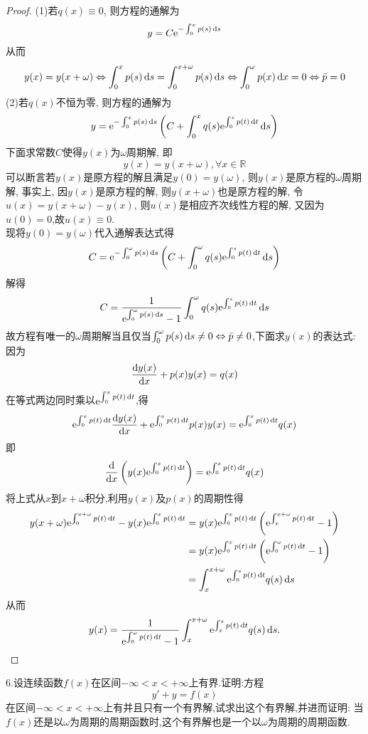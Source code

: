 \begin{proof}(1)若$q(x)\equiv0$, 则方程的通解为
\[y=C\mathrm{e}^{-\int_0^xp(s)\mathop{}\!\mathrm{d} s}\]
从而\[y(x)=y(x+\omega)\Leftrightarrow\int_0^xp(s)\mathop{}\!\mathrm{d} s=\int_0^{x+\omega}p(s)\mathop{}\!\mathrm{d} s\Leftrightarrow\int_0^{\omega}p(x)\mathop{}\!\mathrm{d} x=0\Leftrightarrow\bar{p}=0\]
(2)若$q(x)$不恒为零, 则方程的通解为
\[y=\mathrm{e}^{-\int_0^xp(s)\mathop{}\!\mathrm{d} s}\left(C+\int_0^xq(s)\mathrm{e}^{\int_0^sp(t)\mathop{}\!\mathrm{d} t}\mathop{}\!\mathrm{d} s\right)\]
下面求常数$C$使得$y(x)$为$\omega$周期解, 即
\[y(x)=y(x+\omega),\forall x\in\mathbb{R}\]
可以断言若$y(x)$是原方程的解且满足$y(0)=y(\omega)$, 则$y(x)$是原方程的$\omega$周期解, 事实上, 因$y(x)$是原方程的解, 则$y(x+\omega)$也是原方程的解, 令$u(x)=y(x+\omega)-y(x)$, 则$u(x)$是相应齐次线性方程的解, 又因为$u(0)=0$,故$u(x)\equiv0$.\\
现将$y(0)=y(\omega)$代入通解表达式得
\[C=\mathrm{e}^{-\int_0^{\omega}p(s)\mathop{}\!\mathrm{d} s}\left(C+\int_0^{\omega}q(s)\mathrm{e}^{\int_0^sp(t)\mathop{}\!\mathrm{d} t}\mathop{}\!\mathrm{d} s\right)\]
解得\[C=\frac{1}{\mathrm{e}^{\int_0^{\omega}p(s)\mathop{}\!\mathrm{d} s}-1}\int_0^{\omega}q(s)\mathrm{e}^{\int_0^sp(t)\mathop{}\!\mathrm{d} t}\mathop{}\!\mathrm{d} s\]
故方程有唯一的$\omega$周期解当且仅当$\int_0^{\omega}p(s)\mathop{}\!\mathrm{d} s\neq0\Leftrightarrow\bar{p}\neq0$,下面求$y(x)$的表达式:\\
因为\[\frac{\mathop{}\!\mathrm{d} y(x)}{\mathop{}\!\mathrm{d} x}+p(x)y(x)=q(x)\]
在等式两边同时乘以$\mathrm{e}^{\int_0^xp(t)\mathop{}\!\mathrm{d} t}$,得
\[\mathrm{e}^{\int_0^xp(t)\mathop{}\!\mathrm{d} t}\frac{\mathop{}\!\mathrm{d} y(x)}{\mathop{}\!\mathrm{d} x}+\mathrm{e}^{\int_0^xp(t)\mathop{}\!\mathrm{d} t}p(x)y(x)=\mathrm{e}^{\int_0^xp(t)\mathop{}\!\mathrm{d} t}q(x)\]
即\[\frac{\mathop{}\!\mathrm{d}}{\mathop{}\!\mathrm{d} x}\left(y(x)\mathrm{e}^{\int_0^xp(t)\mathop{}\!\mathrm{d} t}\right)=\mathrm{e}^{\int_0^xp(t)\mathop{}\!\mathrm{d} t}q(x)\]
将上式从$x$到$x+\omega$积分,利用$y(x)$及$p(x)$的周期性得
\[\begin{split}
y(x+\omega)\e^{\int_0^{x+\omega}p(t)\diff t}-y(x)\e^{\int_0^xp(t)\diff t}
&=y(x)\e^{\int_0^xp(t)\diff t}\left(\e^{\int_x^{x+\omega}p(t)\diff t}-1\right)\\
&=y(x)\e^{\int_0^xp(t)\diff t}\left(\e^{\int_0^{\omega}p(t)\diff t}-1\right)\\
&=\int_x^{x+\omega}\e^{\int_0^sp(t)\diff t}q(s)\diff s
\end{split}\]
从而\[y(x)=\frac{1}{\mathrm{e}^{\int_0^{\omega}p(t)\mathop{}\!\mathrm{d} t}-1}\int_x^{x+\omega}\mathrm{e}^{\int_x^sp(t)\mathop{}\!\mathrm{d} t}q(s)\mathop{}\!\mathrm{d} s.\qedhere\]
\end{proof}


6.设连续函数$f(x)$在区间$-\infty<x<+\infty$上有界.证明:方程
\[y'+y=f(x)\]
在区间$-\infty<x<+\infty$上有并且只有一个有界解,试求出这个有界解,并进而证明:
当$f(x)$还是以$\omega$为周期的周期函数时,这个有界解也是一个以$\omega$为周期的周期函数.


